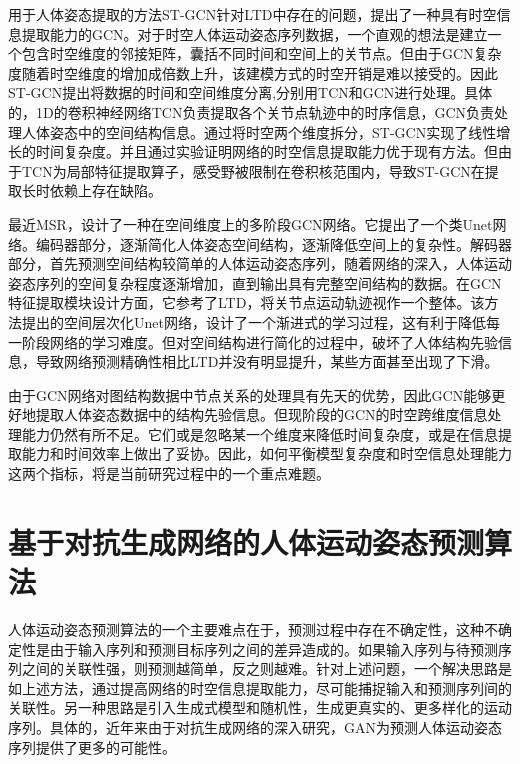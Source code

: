 用于人体姿态提取的方法ST-GCN\parencite{yan2018spatial}针对LTD中存在的问题，提出了一种具有时空信息提取能力的GCN。对于时空人体运动姿态序列数据，一个直观的想法是建立一个包含时空维度的邻接矩阵，囊括不同时间和空间上的关节点。但由于GCN复杂度随着时空维度的增加成倍数上升，该建模方式的时空开销是难以接受的。因此ST-GCN提出将数据的时间和空间维度分离,分别用TCN\parencite{oord2016wavenet}和GCN进行处理。具体的，1D的卷积神经网络TCN负责提取各个关节点轨迹中的时序信息，GCN负责处理人体姿态中的空间结构信息。通过将时空两个维度拆分，ST-GCN实现了线性增长的时间复杂度。并且通过实验证明网络的时空信息提取能力优于现有方法。但由于TCN为局部特征提取算子，感受野被限制在卷积核范围内，导致ST-GCN在提取长时依赖上存在缺陷。

最近MSR\parencite{dang2021msr}，设计了一种在空间维度上的多阶段GCN网络。它提出了一个类Unet\parencite{ronneberger2015u}网络。编码器部分，逐渐简化人体姿态空间结构，逐渐降低空间上的复杂性。解码器部分，首先预测空间结构较简单的人体运动姿态序列，随着网络的深入，人体运动姿态序列的空间复杂程度逐渐增加，直到输出具有完整空间结构的数据。在GCN特征提取模块设计方面，它参考了LTD，将关节点运动轨迹视作一个整体。该方法提出的空间层次化Unet网络，设计了一个渐进式的学习过程，这有利于降低每一阶段网络的学习难度。但对空间结构进行简化的过程中，破坏了人体结构先验信息，导致网络预测精确性相比LTD并没有明显提升，某些方面甚至出现了下滑。

由于GCN网络对图结构数据中节点关系的处理具有先天的优势，因此GCN能够更好地提取人体姿态数据中的结构先验信息。但现阶段的GCN的时空跨维度信息处理能力仍然有所不足。它们或是忽略某一个维度来降低时间复杂度，或是在信息提取能力和时间效率上做出了妥协。因此，如何平衡模型复杂度和时空信息处理能力这两个指标，将是当前研究过程中的一个重点难题。

\section{基于对抗生成网络的人体运动姿态预测算法}
人体运动姿态预测算法的一个主要难点在于，预测过程中存在不确定性，这种不确定性是由于输入序列和预测目标序列之间的差异造成的。如果输入序列与待预测序列之间的关联性强，则预测越简单，反之则越难。针对上述问题，一个解决思路是如上述方法，通过提高网络的时空信息提取能力，尽可能捕捉输入和预测序列间的关联性。另一种思路是引入生成式模型和随机性，生成更真实的、更多样化的运动序列。具体的，近年来由于对抗生成网络\parencite{goodfellow2020generative}的深入研究，GAN为预测人体运动姿态序列提供了更多的可能性。

